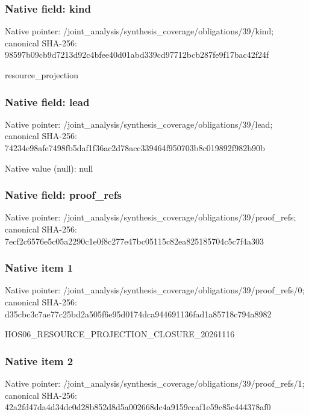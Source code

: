 \documentclass[10pt,a4paper]{article}
\begin{document}
\subsubsection{Native field: kind}
Native pointer: /joint\_\allowbreak{}analysis/synthesis\_\allowbreak{}coverage/obligations/39/kind; canonical SHA-256: 98597b09cb9d7213d92c4bfee40d01abd339cd97712bcb287fe9f17bac42f24f

\begingroup\raggedright\sloppy resource\_\allowbreak{}projection\par\endgroup

\subsubsection{Native field: lead}
Native pointer: /joint\_\allowbreak{}analysis/synthesis\_\allowbreak{}coverage/obligations/39/lead; canonical SHA-256: 74234e98afe7498fb5daf1f36ac2d78acc339464f950703b8c019892f982b90b

Native value (null): null

\subsubsection{Native field: proof\_\allowbreak{}refs}
Native pointer: /joint\_\allowbreak{}analysis/synthesis\_\allowbreak{}coverage/obligations/39/proof\_\allowbreak{}refs; canonical SHA-256: 7ecf2c6576e5c05a2290c1e0f8c277e47bc05115c82ea825185704c5c7f4a303

\subsubsection{Native item 1}
Native pointer: /joint\_\allowbreak{}analysis/synthesis\_\allowbreak{}coverage/obligations/39/proof\_\allowbreak{}refs/0; canonical SHA-256: d35cbc3c7ae77c25bd2a505f6e95d0174dca944691136fad1a85718c794a8982

\begingroup\raggedright\sloppy HOS06\_\allowbreak{}RESOURCE\_\allowbreak{}PROJECTION\_\allowbreak{}CLOSURE\_\allowbreak{}20261116\par\endgroup

\subsubsection{Native item 2}
Native pointer: /joint\_\allowbreak{}analysis/synthesis\_\allowbreak{}coverage/obligations/39/proof\_\allowbreak{}refs/1; canonical SHA-256: 42a2fd47da4d34dc0d28b852d8d5a002668dc4a9159ccaf1e59c85c444378af0
\end{document}

